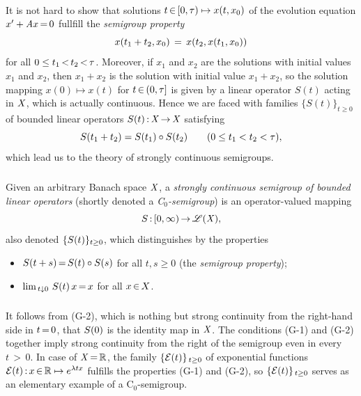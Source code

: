 \documentclass[11pt,twoside]{article}
\begin{document}
\paragraph{} %
It is not hard to show
that solutions $t \xeof [0,\T) \mapsto x(t,x_0)$ of the evolution equation
$x' + \linA x \eq 0$ fullfill the \textit{semi\-group property}
\[
x(t_1 + t_2,x_0) \= x(t_2, x(t_1,x_0))
\]
for all $0 \leq t_1 {\,<\,} t_2 {\,<\,} \T$.
Moreover,
if $x_1$ and $x_2$ are the solutions with initial values $x_1$ and $x_2$,
then $x_1+x_2$ is the solution with initial value $x_1+x_2$,
so the solution mapping $x(0) \mapsto x(t)$ for $t \xeof (0,\T]$
is given by a linear operator $S(t)$ acting in $\banX$,
which is actually continuous.
Hence we are faced with families $\{S(t)\}_{t \geq 0}$
of bounded linear operators $S(t) \: \banX \xto \banX$ satisfying
\[
S(t_1+t_2) = S(t_1) \circ S(t_2) \quad \quad (0 \leq t_1 < t_2 < \T),
\]
which lead us to the theory of {strongly continuous semigroups}.

\subparagraph{} %
Given an arbitrary Banach space $\banX$,
a \textit{strongly continuous semigroup of bounded linear operators}
(shortly denoted a \textit{C$_0$-semigroup}) is an operator-valued mapping
\[
\linS \: [0,\infty) \xto \BO{\banX},
\]
also denoted $\{\linS(t)\}_{t \geq 0}$,
which distinguishes by the properties

\begin{itemize}[leftmargin=12mm]
\item[(G-1)]
$\linS(t+s) \eq \linS(t) \circ \linS(s)$ for all $t,s \geq 0$
(the \textit{semigroup property});

\item[(G-2)]
$\lim_{\,t \downarrow 0} \, \linS(t)\,x \eq x$ for all $x \xeof X$.
\end{itemize}

\subparagraph{} %
It follows from (G-2),
which is nothing but strong continuity from the right-hand side in $t \eq 0$,
that $\linS(0)$ is the identity map in $\banX$.
The conditions (G-1) and (G-2) together
imply strong continuity from the right of the semigroup
even in every $t {\,>\,} 0$.
In case of $\banX \eq \R$,
the family $\{\cal{E}(t)\}_{\, t \geq 0}$ of exponential functions
$\cal{E}(t) \: x \xeof \R \mapsto e^{\lambda tx}$
fulfills the properties (G-1) and (G-2),
so $\{\cal{E}(t)\}_{\, t \geq 0}$ serves as an elementary example
of a C$_0$-semigroup.
\end{document}
